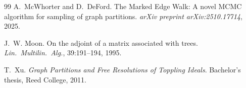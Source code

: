 \documentclass[11pt]{article}
\begin{document}
\begin{thebibliography}{99}
A.~McWhorter and D.~DeFord.
\newblock The {M}arked {E}dge {W}alk: A novel {MCMC} algorithm for sampling of
  graph partitions.
\newblock \emph{arXiv preprint arXiv:2510.17714}, 2025.

J.~W. Moon.
\newblock On the adjoint of a matrix associated with trees.
\newblock \emph{Lin.\ Multilin.\ Alg.}, 39:191--194, 1995.

T.~Xu.
\newblock \emph{Graph Partitions and Free Resolutions of Toppling Ideals}.
\newblock Bachelor's thesis, Reed College, 2011.

\end{thebibliography}
\end{document}
